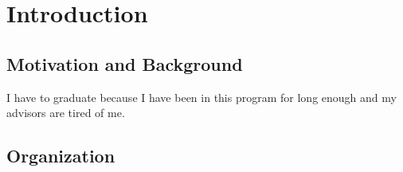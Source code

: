 \chapter{Introduction}
\label{ch1}
\section{Motivation and Background}

I have to graduate because I have been in this program for long enough and my advisors are tired of me.

\section{Organization}



